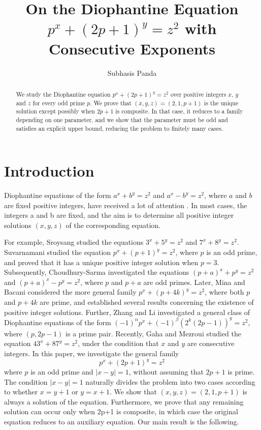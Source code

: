 \documentclass[reqno,12pt]{amsart}
\title{On the Diophantine Equation $\displaystyle p^x+ (2p+1)^y =z^2$ with Consecutive Exponents}
\author{Subhasis Panda} %
\theoremstyle{definition}
\begin{document}
\begin{abstract} { We study the Diophantine equation $p^x+ (2p+1)^y =z^2$ over positive integers $x$, $y$ and $z$ for every odd prime $p$. We prove that $(x,y,z)=(2,1,p+1)$ is the unique solution except possibly when $2p+1$ is composite. In that case, it reduces to a family depending on one parameter, and we show that the parameter must be odd and satisfies an explicit upper bound, reducing the problem to finitely many cases.
}\end{abstract}

\maketitle

\setcounter{tocdepth}{1}
\tableofcontents
\section{Introduction}
Diophantine equations of the form $a^x+b^y=z^2$ and $a^x-b^y=z^2$,
where $a$ and $b$ are fixed positive integers, have received a lot of attention \cite{BorahDutta2022,Le1995,MinaBacani2021,ZhangLi2024,Sroysang2012,GahaMezroui2026,ChoudhurySarma2026}. In most cases, the integers a and b are fixed, and the aim is to determine all positive integer solutions $(x,y,z)$ of the corresponding equation.

For example, Sroysang\cite{Sroysang2012,Sroysang2013} studied the equations $3^x + 5^y = z^2$ and $7^x + 8^y = z^2$. 
Suvarnamani \cite{Suvarnamani2014} studied the equation $p^x+(p+1)^y=z^2$, where $p$ is an odd prime, and proved that it has a unique positive integer solution when $p=3$. Subsequently, Choudhury-Sarma \cite{ChoudhurySarma2026} investigated the  equations $(p+a)^x+p^y=z^{2}$ and $(p+a)^x-p^y=z^{2}$, where $p$ and $p+a$ are odd primes.
Later, Mina and Bacani \cite{MinaBacani2021} considered the more general family $p^x+(p+4k)^y=z^2$, where both $p$ and $p+4k$ are prime, and established several results concerning the existence of positive integer solutions. Further, Zhang and Li \cite{ZhangLi2024} investigated a general class of Diophantine equations of the form $(-1)^\alpha p^x+(-1)^\beta\left(2^k(2p-1)\right)^y=z^2$, where $(p,2p-1)$ is a prime pair. Recently, Gaha and Mezroui \cite{GahaMezroui2026} studied the equation $43^x+87^y=z^2$, under the condition that $x$ and $y$ are consecutive integers. In this paper, we investigate the general family
\begin{equation} \label{equation1}
p^x + \left ( 2p +1 \right)^y = z^2    
\end{equation}
where $p$ is an odd prime and $|x-y|=1$, without assuming that $2p+1$ is prime. 
The condition $|x-y|=1$ naturally divides the problem into two cases according to whether $x=y+1$ or $y=x+1$.  
We show that $(x,y,z)=(2,1,p+1)$ is always a solution of the equation. 
Furthermore, we prove that any remaining solution can occur only when 2p+1 is composite, in which case the original equation reduces to an auxiliary equation. Our main result is the following.
\end{document}

